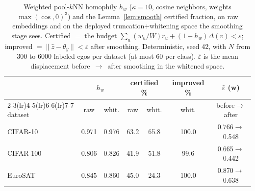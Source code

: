 \begin{table}[t]
\centering
\small
\caption{Weighted pool-$k$NN homophily $h_w$ ($\kappa = 10$, cosine neighbors, weights $\max(\cos,0)^3$) and the Lemma~\ref{lem:smooth} certified fraction, on raw embeddings and on the deployed truncation$+$whitening space the smoothing stage sees. Certified $=$ the budget $\sum_u (w_u/W) r_u + (1-h_w)\Delta(v) < \varepsilon$; improved $= \lVert \hat z - \theta_y\rVert < \varepsilon$ after smoothing. Deterministic, seed 42, with $N$ from 300 to 6000 labeled egos per dataset (at most 60 per class). $\bar\varepsilon$ is the mean displacement before~$\to$~after smoothing in the whitened space.}
\label{tab:h-cert}
\begin{tabular}{lcccccc}
\toprule
 & \multicolumn{2}{c}{$h_w$} & \multicolumn{2}{c}{certified \%} & improved \% & $\bar\varepsilon$ (w) \\
\cmidrule(lr){2-3}\cmidrule(lr){4-5}\cmidrule(lr){6-6}\cmidrule(lr){7-7}
dataset & raw & whit. & raw & whit. & whit. & before$\to$after \\
\midrule
CIFAR-10 & 0.971 & 0.976 & 63.2 & 65.8 & 100.0 & 0.766$\to$0.548 \\
CIFAR-100 & 0.806 & 0.826 & 41.9 & 51.8 & 99.6 & 0.665$\to$0.442 \\
EuroSAT & 0.845 & 0.860 & 45.0 & 24.3 & 100.0 & 0.870$\to$0.638 \\
\bottomrule
\end{tabular}
\end{table}
